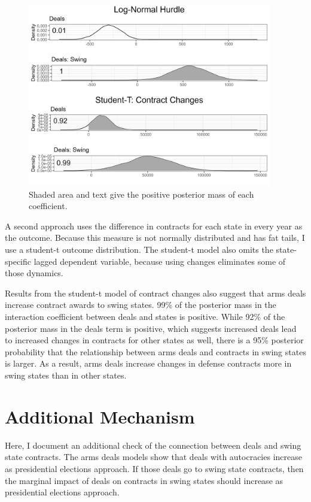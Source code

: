 \documentclass[12pt]{article}
\begin{document}
\begin{figure}[htpb]
	\centering
		\includegraphics[width=0.95\textwidth]{me-deals-check.png}
	\caption{Shaded area and text give the positive posterior mass of each coefficient.}
	\label{fig:me-deals-check}
\end{figure}


A second approach uses the difference in contracts for each state in every year as the outcome. 
Because this measure is not normally distributed and has fat tails, I use a student-t outcome distribution.
The student-t model also omits the state-specific lagged dependent variable, because using changes eliminates some of those dynamics. 


Results from the student-t model of contract changes also suggest that arms deals increase contract awards to swing states. 
99\% of the posterior mass in the interaction coefficient between deals and states is positive.
While 92\% of the posterior mass in the deals term is positive, which suggests increased deals lead to increased changes in contracts for other states as well, there is a 95\% posterior probability that the relationship between arms deals and contracts in swing states is larger. 
As a result, arms deals increase changes in defense contracts more in swing states than in other states. 


\newpage 

\section{Additional Mechanism}

Here, I document an additional check of the connection between deals and swing state contracts. 
The arms deals models show that deals with autocracies increase as presidential elections approach. 
If those deals go to swing state contracts, then the marginal impact of deals on contracts in swing states should increase as presidential elections approach. 
\end{document}
